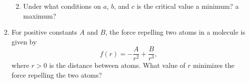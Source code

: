 \documentclass[11pt]{article}
\begin{document}
\begin{enumerate}
\begin{enumerate}
    \vfill
    
  \item Under what conditions on $a$, $b$, and $c$ is the critical
    value a minimum? a maximum?
    
    \vfill
  \end{enumerate}
  
  \newpage
  
\item For positive constants $A$ and $B$, the force repelling two atoms
  in a molecule is given by
  \[
  f(r)=-\dfrac{A}{r^2}+\dfrac{B}{r^3},
  \]
  where $r>0$ is the distance between atoms. What value of $r$
  minimizes the force repelling the two atoms?




\end{enumerate}
\end{document}
